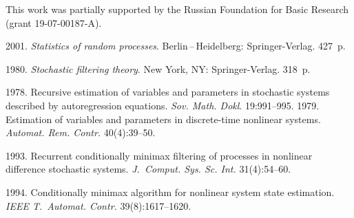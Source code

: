 \vspace*{3pt}
     
    
    \vspace*{3pt}
    


\Ack
    \noindent
    This work was partially supported by the Russian Foundation
    for Basic Research (grant  
19-07-00187-A).

\vspace*{12pt}

  \begin{multicols}{2}

\renewcommand{\bibname}{\protect\rmfamily References}

{\small\frenchspacing
 {%
 \begin{thebibliography}{99}
 
 \vspace*{-2pt}

 2001. \textit{Statistics of random processes}. 
Berlin\,--\,Heidelberg: Springer-Verlag. 427~p.

 1980. \textit{Stochastic filtering theory}. New York, NY: 
Springer-Verlag. 318~p.

 1978. 
Recursive estimation of variables and parameters in stochastic systems described by 
autoregression equations. \textit{Sov. Math.
Dokl}. 19:991--995.
 1979. Estimation of variables and parameters in 
discrete-time nonlinear systems. \textit{Automat. Rem. Contr.} 40(4):39--50.

\columnbreak

 1993. Recurrent conditionally minimax filtering of 
processes in nonlinear difference stochastic systems. 
\textit{J.~Comput. Sys. Sc. Int.} 31(4):54--60.


 1994. Conditionally minimax algorithm 
for nonlinear system state estimation. \textit{IEEE T.~Automat. Contr.} 39(8):1617--1620.


\end{thebibliography}}}
\end{multicols}
